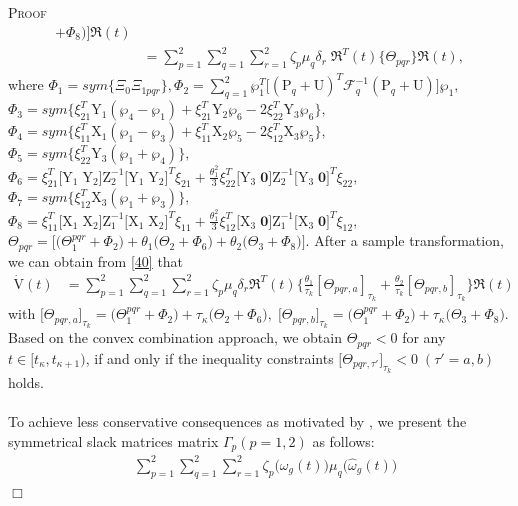 \documentclass[preprint,11pt]{elsarticle}
\newenvironment{proof}{\noindent \textsc{Proof}\ }{\mbox{}\hfill $\Box$\\}
\begin{document}
\begin{proof}
\begin{align}
+\Phi_8 \big) \Big]\Re(t)\nonumber\\
&=\sum^{2}_{p=1}\sum^{2}_{q=1}\sum^{2}_{r=1}\zeta_p\mu_q\delta_r\;\Re^T(t)
\big\{\Theta_{pqr}\big\} \Re(t),
\end{align}
where
$
\Phi_1=sym\{\Xi_0\Xi_{1pqr}\},\Phi_2=\sum^{2}_{q=1}\wp^T_1\big[(\mathrm{P}_q+\mathrm{U})^T  {\mathcal{F}^{-1}_q} (\mathrm{P}_q+\mathrm{U})\big]\wp_1,$
$\Phi_3=sym\big\{ \xi_{21}^T \mathrm{Y}_1(\wp_4-\wp_1)+\xi_{21}^T\mathrm{Y}_2\wp_6-2\xi_{22}^T\mathrm{Y}_3\wp_6\big\},$
$\Phi_4=sym\big\{ \xi_{11}^T \mathrm{X}_1(\wp_1-\wp_3)+\xi_{11}^T\mathrm{X}_2\wp_5-2\xi_{12}^T\mathrm{X}_3\wp_5\big\},$
$\Phi_5=sym\{\xi_{22}^T\mathrm{Y}_3(\wp_1+\wp_4)\},$
$\Phi_6=\xi_{21}^T \big[\mathrm{Y}_1\;\mathrm{Y}_2 \big]\mathrm{Z}_2^{-1}\big[ \mathrm{Y}_1\;\mathrm{Y}_2 \big]^T\xi_{21}
+\frac{\theta_{1}^2}{3}\xi_{22}^T\big[ \mathrm{Y}_3\;\mathbf{0} \big]\mathrm{Z}_2^{-1}\big[ \mathrm{Y}_3\;\mathbf{0} \big]^T\xi_{22},$
$\Phi_7=sym\big\{ \xi_{12}^T \mathrm{X}_3(\wp_1+\wp_3)\big\},$
$\Phi_8=\xi_{11}^T \big[\mathrm{X}_1\;\mathrm{X}_2 \big]\mathrm{Z}_1^{-1}\big[ \mathrm{X}_1\;\mathrm{X}_2 \big]^T\xi_{11}
+\frac{\theta_{1}^2}{3}\xi_{12}^T\big[ \mathrm{X}_3\;\mathbf{0} \big]\mathrm{Z}_1^{-1}\big[ \mathrm{X}_3\;\mathbf{0} \big]^T\xi_{12},$
$\Theta_{pqr}=\big[ \big(\Theta_1^{pqr}+\Phi_2\big)+\theta_1 \big(\Theta_2+\Phi_6\big)+\theta_2 \big(\Theta_3+\Phi_8\big)  \big].$
After a sample transformation, we can obtain from \eqref{40} that
\begin{align}
\mathrm{\dot{V}}(t)&=\sum^{2}_{p=1}\sum^{2}_{q=1}\sum^{2}_{r=1}\zeta_p\mu_q\delta_r\Re^T(t)\big\{ \frac{\theta_1}{\tau_k}[ \Theta_{pqr,a}  ]_{\tau_k}
+\frac{\theta_2}{\tau_k}[ \Theta_{pqr,b}  ]_{\tau_k} \big\}\Re(t)\label{AAA}
\end{align}
with
$
\big[ \Theta_{pqr,a}  \big]_{\tau_k}=\big(\Theta_1^{pqr}+\Phi_2\big)+\tau_\kappa\big(\Theta_2+\Phi_6\big), \;
\big[ \Theta_{pqr,b}  \big]_{\tau_k}=\big(\Theta_1^{pqr}+\Phi_2\big)+\tau_\kappa\big(\Theta_3+\Phi_8\big).
$
Based on the convex combination approach, we obtain $\Theta_{pqr}<0$ for any $t\in[t_{\kappa},t_{\kappa+1})$, if and only if the inequality constraints
$\big[ \Theta_{pqr,\tau'}  \big]_{\tau_k}<0\;(\tau'=a,b)$ holds.\\\\
To achieve less conservative consequences as motivated by \cite{slack1}, we present the symmetrical slack matrices matrix $\Gamma_p(p=1,2)$ as follows:
\begin{align}
&\sum^{2}_{p=1}\sum^{2}_{q=1}\sum^{2}_{r=1}\zeta_p\big(\omega_g(t)\big)\mu_q\big(\hat{\omega}_g(t)\big)

\end{align}
\end{proof}
\end{document}
